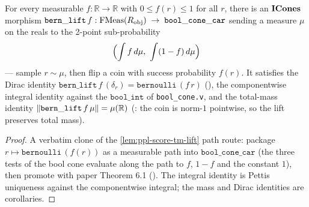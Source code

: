 \begin{lemma}%
\label{lem:ppl-bern-lift}
\rocqok
{}\rocqok
{}\rocqok
{}\rocqok
{}
For every measurable $f : \mathbb{R} \to \mathbb{R}$ with
$0 \le f(r) \le 1$ for all $r$, there is an $\mathbf{ICones}$ morphism
$\mathtt{bern\_lift}\,f :
   \mathrm{FMeas}(R_{\mathrm{obj}}) \;\to\; \mathtt{bool\_cone\_car}$
sending a measure $\mu$ on the reals to the 2-point sub-probability
\[
  \Bigl(\int f \, d\mu,\ \int (1 - f)\, d\mu\Bigr)
\]
--- sample $r \sim \mu$, then flip a coin with success probability
$f(r)$. It satisfies the Dirac identity
$\mathtt{bern\_lift}\,f\,(\delta_r) =
\mathtt{bernoulli}\,(f\,r)$
(), the componentwise
integral identity  against the
$\mathtt{bool\_int}$ of \texttt{bool\_cone.v}, and the total-mass
identity $\lVert \mathtt{bern\_lift}\,f\,\mu \rVert = \mu(\mathbb{R})$
(: the coin is norm-$1$
pointwise, so the lift preserves total mass).
\end{lemma}

\begin{proof}
A verbatim clone of the \autoref{lem:ppl-score-tm-lift} path route:
package $r \mapsto \mathtt{bernoulli}\,(f(r))$ as a measurable path
into $\mathtt{bool\_cone\_car}$ (the three tests of the bool cone
evaluate along the path to $f$, $1 - f$ and the constant $1$), then
promote with paper Theorem 6.1
(). The integral identity is
Pettis uniqueness against the componentwise integral; the mass and
Dirac identities are corollaries.
\end{proof}

